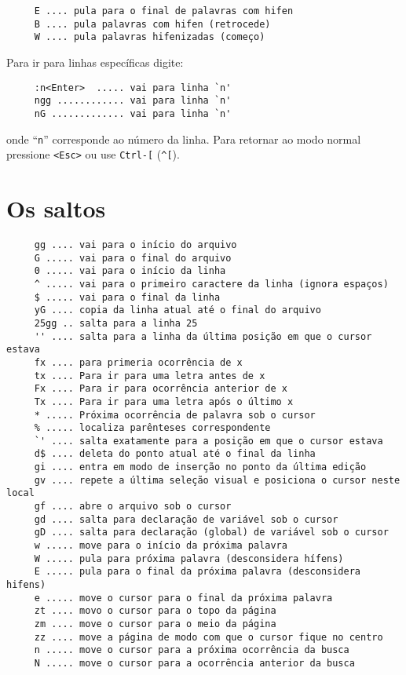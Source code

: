 \begin{verbatim}
     E .... pula para o final de palavras com hifen
     B .... pula palavras com hifen (retrocede)
     W .... pula palavras hifenizadas (começo)
\end{verbatim}



Para ir para linhas específicas digite:

\begin{verbatim}
     :n<Enter>  ..... vai para linha `n'
     ngg ............ vai para linha `n'
     nG ............. vai para linha `n'
\end{verbatim}

onde ``\verb|n|'' corresponde ao número da linha.  Para retornar ao modo normal
pressione \verb|<Esc>| ou use \verb|Ctrl-[| (\verb|^[|).

\section{Os saltos}\label{Os saltos}

\begin{verbatim}
     gg .... vai para o início do arquivo
     G ..... vai para o final do arquivo
     0 ..... vai para o início da linha
     ^ ..... vai para o primeiro caractere da linha (ignora espaços)
     $ ..... vai para o final da linha
     yG .... copia da linha atual até o final do arquivo
     25gg .. salta para a linha 25
     '' .... salta para a linha da última posição em que o cursor estava
     fx .... para primeria ocorrência de x
     tx .... Para ir para uma letra antes de x
     Fx .... Para ir para ocorrência anterior de x
     Tx .... Para ir para uma letra após o último x
     * ..... Próxima ocorrência de palavra sob o cursor
     % ..... localiza parênteses correspondente
     `' .... salta exatamente para a posição em que o cursor estava
     d$ .... deleta do ponto atual até o final da linha
     gi .... entra em modo de inserção no ponto da última edição
     gv .... repete a última seleção visual e posiciona o cursor neste local
     gf .... abre o arquivo sob o cursor
     gd .... salta para declaração de variável sob o cursor
     gD .... salta para declaração (global) de variável sob o cursor
     w ..... move para o início da próxima palavra
     W ..... pula para próxima palavra (desconsidera hífens)
     E ..... pula para o final da próxima palavra (desconsidera hifens)
     e ..... move o cursor para o final da próxima palavra
     zt .... movo o cursor para o topo da página
     zm .... move o cursor para o meio da página
     zz .... move a página de modo com que o cursor fique no centro
     n ..... move o cursor para a próxima ocorrência da busca
     N ..... move o cursor para a ocorrência anterior da busca
\end{verbatim}

